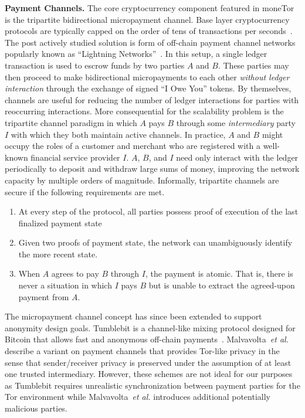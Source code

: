 \medskip
\noindent\textbf{Payment Channels.} The core cryptocurrency component featured
in moneTor is the tripartite bidirectional micropayment channel. Base layer
cryptocurrency protocols are typically capped on the order of tens of
transactions per seconds~\cite{team2018blockchain}. The post actively studied
solution is form of off-chain payment channel networks popularly known as
``Lightning Networks''~\cite{poon2016bitcoin}. In this setup, a single ledger
transaction is used to escrow funds by two parties $A$ and $B$. These parties
may then proceed to make bidirectional micropayments to each other \emph{without
  ledger interaction} through the exchange of signed ``I Owe You'' tokens. By
themselves, channels are useful for reducing the number of ledger interactions
for parties with reoccurring interactions. More consequential for the
scalability problem is the tripartite channel paradigm in which $A$ pays $B$
through some \emph{intermediary} party $I$ with which they both maintain active
channels. In practice, $A$ and $B$ might occupy the roles of a customer and
merchant who are registered with a well-known financial service provider $I$.
$A$, $B$, and $I$ need only interact with the ledger periodically to deposit and
withdraw large sums of money, improving the network capacity by multiple orders
of magnitude. Informally, tripartite channels are secure if the following
requirements are met.

\begin{enumerate}
\item At every step of the protocol, all parties possess proof of execution of
  the last finalized payment state
\item Given two proofs of payment state, the network can unambiguously identify
  the more recent state.
\item When $A$ agrees to pay $B$ through $I$, the payment is atomic. That is,
  there is never a situation in which $I$ pays $B$ but is unable to extract the
  agreed-upon payment from $A$.
\end{enumerate}


 The micropayment channel concept has since been extended to support anonymity
 design goals. Tumblebit is a channel-like mixing protocol designed for Bitcoin
 that allows fast and anonymous off-chain payments~\cite{heilman2017tumblebit}.
 Malvavolta~\textit{et al.}~\cite{malavolta2017concurrency} describe a variant on
 payment channels that provides Tor-like privacy in the sense that
 sender/receiver privacy is preserved under the assumption of at least one
 trusted intermediary. However, these schemes are not ideal for our purposes as
 Tumblebit requires unrealistic synchronization between payment parties for the
 Tor environment while Malvavolta~\textit{et al.} introduces additional
 potentially malicious parties.

